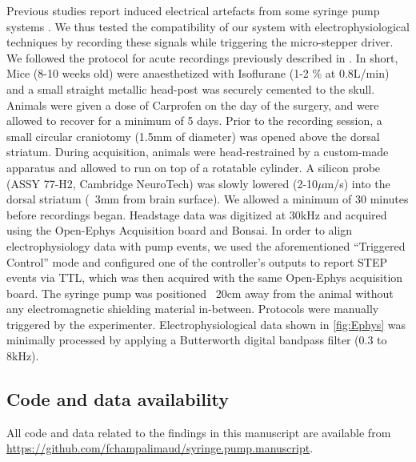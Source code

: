 Previous studies report induced electrical artefacts from some syringe pump systems \citep{Amarante2019}. We thus tested the compatibility of our system with electrophysiological techniques by recording these signals while triggering the micro-stepper driver. 
We followed the protocol for acute recordings previously described in \cite{Cruz2022}. In short, Mice (8-10 weeks old) were anaesthetized with Isoflurane (1-2 \% at 0.8L/min) and a small straight metallic head-post was securely cemented to the skull. Animals were given a dose of Carprofen on the day of the surgery, and were allowed to recover for a minimum of 5 days. Prior to the recording session, a small circular craniotomy (1.5mm of diameter) was opened above the dorsal striatum. During acquisition, animals were head-restrained by a custom-made apparatus and allowed to run on top of a rotatable cylinder. A silicon probe (ASSY 77-H2, Cambridge NeuroTech) was slowly lowered (2-10$\mu$m/s) into the dorsal striatum (~3mm from brain surface). We allowed a minimum of 30 minutes before recordings began. Headstage data was digitized at 30kHz and acquired using the Open-Ephys Acquisition board and Bonsai. In order to align electrophysiology data with pump events, we used the aforementioned “Triggered Control” mode and configured one of the controller’s outputs to report STEP events via TTL, which was then acquired with the same Open-Ephys acquisition board. The syringe pump was positioned ~20cm away from the animal without any electromagnetic shielding material in-between. Protocols were manually triggered by the experimenter.
Electrophysiological data shown in \ref{fig:Ephys} was minimally processed by applying a Butterworth digital bandpass filter (0.3 to 8kHz).

\subsection{Code and data availability}
All code and data related to the findings in this manuscript are available from \url{https://github.com/fchampalimaud/syringe.pump.manuscript}.


